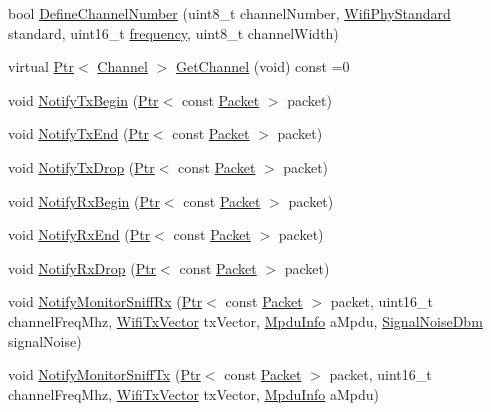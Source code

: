 \begin{DoxyCompactItemize}
bool \hyperlink{classns3_1_1WifiPhy_a98bb7224e78132362285630d3c0597c9}{Define\+Channel\+Number} (uint8\+\_\+t channel\+Number, \hyperlink{group__wifi_ga1299834f4e1c615af3ca738033b76a49}{Wifi\+Phy\+Standard} standard, uint16\+\_\+t \hyperlink{mmwave_2model_2fading-traces_2fading__trace__generator_8m_a09045328d6d7e16aa4013f526cc6993d}{frequency}, uint8\+\_\+t channel\+Width)
\item 
virtual \hyperlink{classns3_1_1Ptr}{Ptr}$<$ \hyperlink{classns3_1_1Channel}{Channel} $>$ \hyperlink{classns3_1_1WifiPhy_afa06077425565033505674c1b122c2e8}{Get\+Channel} (void) const =0
\item 
void \hyperlink{classns3_1_1WifiPhy_a8a78a3300f20dae6e36b6b871b00e324}{Notify\+Tx\+Begin} (\hyperlink{classns3_1_1Ptr}{Ptr}$<$ const \hyperlink{classns3_1_1Packet}{Packet} $>$ packet)
\item 
void \hyperlink{classns3_1_1WifiPhy_a82b202f4fa004145ee2f206f9de1be1b}{Notify\+Tx\+End} (\hyperlink{classns3_1_1Ptr}{Ptr}$<$ const \hyperlink{classns3_1_1Packet}{Packet} $>$ packet)
\item 
void \hyperlink{classns3_1_1WifiPhy_a32d02a68271c4a8a42ec023e2b1b81e7}{Notify\+Tx\+Drop} (\hyperlink{classns3_1_1Ptr}{Ptr}$<$ const \hyperlink{classns3_1_1Packet}{Packet} $>$ packet)
\item 
void \hyperlink{classns3_1_1WifiPhy_a9a8f2c1e72c030fd8174c7a65fd5907d}{Notify\+Rx\+Begin} (\hyperlink{classns3_1_1Ptr}{Ptr}$<$ const \hyperlink{classns3_1_1Packet}{Packet} $>$ packet)
\item 
void \hyperlink{classns3_1_1WifiPhy_a878717b5caea24312151a54461842ec9}{Notify\+Rx\+End} (\hyperlink{classns3_1_1Ptr}{Ptr}$<$ const \hyperlink{classns3_1_1Packet}{Packet} $>$ packet)
\item 
void \hyperlink{classns3_1_1WifiPhy_a72138f22fada63f61f2026b86aa5abd2}{Notify\+Rx\+Drop} (\hyperlink{classns3_1_1Ptr}{Ptr}$<$ const \hyperlink{classns3_1_1Packet}{Packet} $>$ packet)
\item 
void \hyperlink{classns3_1_1WifiPhy_a582de54d4e2e0a49581635d1c8f60512}{Notify\+Monitor\+Sniff\+Rx} (\hyperlink{classns3_1_1Ptr}{Ptr}$<$ const \hyperlink{classns3_1_1Packet}{Packet} $>$ packet, uint16\+\_\+t channel\+Freq\+Mhz, \hyperlink{classns3_1_1WifiTxVector}{Wifi\+Tx\+Vector} tx\+Vector, \hyperlink{structns3_1_1MpduInfo}{Mpdu\+Info} a\+Mpdu, \hyperlink{structns3_1_1SignalNoiseDbm}{Signal\+Noise\+Dbm} signal\+Noise)
\item 
void \hyperlink{classns3_1_1WifiPhy_a0e40477bb60526d46673a809e6b71132}{Notify\+Monitor\+Sniff\+Tx} (\hyperlink{classns3_1_1Ptr}{Ptr}$<$ const \hyperlink{classns3_1_1Packet}{Packet} $>$ packet, uint16\+\_\+t channel\+Freq\+Mhz, \hyperlink{classns3_1_1WifiTxVector}{Wifi\+Tx\+Vector} tx\+Vector, \hyperlink{structns3_1_1MpduInfo}{Mpdu\+Info} a\+Mpdu)

\end{DoxyCompactItemize}
